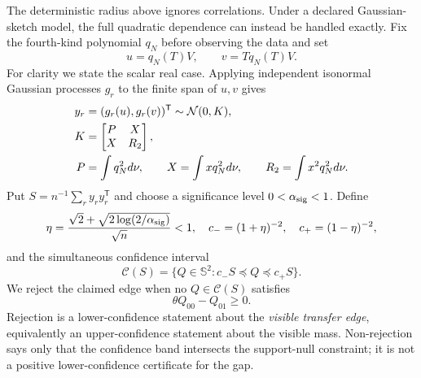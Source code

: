 \documentclass[11pt]{article}
\theoremstyle{definition}
\theoremstyle{remark}
\begin{document}
The deterministic radius above ignores correlations.  Under a declared
Gaussian-sketch model, the full quadratic dependence can instead be handled
exactly.  Fix the fourth-kind polynomial $q_N$ before observing the data and set
\begin{equation}
 u=q_N(T)V,\qquad v=Tq_N(T)V.                        \label{eq:filteredvectors}
\end{equation}
For clarity we state the scalar real case.  Applying independent isonormal
Gaussian processes $g_r$ to the finite span of $u,v$ gives
\begin{align}
 y_r&=(g_r(u),g_r(v))^{\mathsf T}\sim\mathcal N(0,K),\notag\\
 K&=\begin{bmatrix}P&X\\X&R_2\end{bmatrix},\notag\\
 P&=\int q_N^2d\nu,\qquad X=\int xq_N^2d\nu,\qquad
 R_2=\int x^2q_N^2d\nu.                              \label{eq:filteredK}
\end{align}
Put $S=n^{-1}\sum_ry_ry_r^{\mathsf T}$ and choose a significance level
$0<\alpha_{\rm sig}<1$.  Define
\begin{equation}
 \eta=\frac{\sqrt2+\sqrt{2\log(2/\alpha_{\rm sig})}}{\sqrt n}<1,
 \quad c_-=(1+\eta)^{-2},\quad c_+=(1-\eta)^{-2},      \label{eq:wishartconstants}
\end{equation}
and the simultaneous confidence interval
\begin{equation}
 \mathcal C(S)=\{Q\in\mathbb S^2:c_-S\preceq Q\preceq c_+S\}. \label{eq:confidenceband}
\end{equation}
We reject the claimed edge when no $Q\in\mathcal C(S)$ satisfies
\begin{equation}
                         \theta Q_{00}-Q_{01}\geq0.   \label{eq:filterednull}
\end{equation}
Rejection is a lower-confidence statement about the \emph{visible transfer
edge}, equivalently an upper-confidence statement about the visible mass.
Non-rejection says only that the confidence band intersects the support-null
constraint; it is not a positive lower-confidence certificate for the gap.
\end{document}
